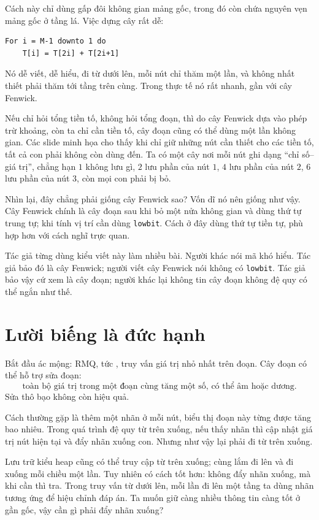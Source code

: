 \documentclass[11pt]{article}
\begin{document}
Cách này chỉ dùng gấp đôi không gian mảng gốc, trong đó còn chứa nguyên vẹn
mảng gốc ở tầng lá.  Việc dựng cây rất dễ:
\begin{verbatim}
For i = M-1 downto 1 do
    T[i] = T[2i] + T[2i+1]
\end{verbatim}
Nó dễ viết, dễ hiểu, đi từ dưới lên, mỗi nút chỉ thăm một lần, và không nhất
thiết phải thăm tới tầng trên cùng.  Trong thực tế nó rất nhanh, gần với cây
Fenwick.

Nếu chỉ hỏi tổng tiền tố, không hỏi tổng đoạn, thì do cây Fenwick dựa vào phép
trừ khoảng, còn ta chỉ cần tiền tố, cây đoạn cũng có thể dùng một lần không
gian.  Các slide minh họa cho thấy khi chỉ giữ những nút cần thiết cho các
tiền tố, tất cả con phải không còn dùng đến.  Ta có một cây nơi mỗi nút ghi
dạng ``chỉ số--giá trị'', chẳng hạn $1$ không lưu gì, $2$ lưu phần của nút
$1$, $4$ lưu phần của nút $2$, $6$ lưu phần của nút $3$, còn mọi con phải bị
bỏ.

Nhìn lại, đây chẳng phải giống cây Fenwick sao?  Vốn dĩ nó nên giống như vậy.
Cây Fenwick chính là cây đoạn sau khi bỏ một nửa không gian và dùng thứ tự
trung tự; khi tính vị trí cần dùng \texttt{lowbit}.  Cách ở đây dùng thứ tự
tiền tự, phù hợp hơn với cách nghĩ trực quan.

Tác giả từng dùng kiểu viết này làm nhiều bài.  Người khác nói mã khó hiểu.
Tác giả bảo đó là cây Fenwick; người viết cây Fenwick nói không có
\texttt{lowbit}.  Tác giả bảo vậy cứ xem là cây đoạn; người khác lại không tin
cây đoạn không đệ quy có thể ngắn như thế.

\section{Lười biếng là đức hạnh}

Bắt đầu ác mộng: RMQ, tức , truy vấn giá trị nhỏ nhất
trên đoạn.  Cây đoạn có thể hỗ trợ sửa đoạn:
\[
  \text{toàn bộ giá trị trong một đoạn cùng tăng một số, có thể âm hoặc dương.}
\]
Sửa thô bạo không còn hiệu quả.

Cách thường gặp là thêm một nhãn ở mỗi nút, biểu thị đoạn này từng được tăng
bao nhiêu.  Trong quá trình đệ quy từ trên xuống, nếu thấy nhãn thì cập nhật
giá trị nút hiện tại và đẩy nhãn xuống con.  Nhưng như vậy lại phải đi từ trên
xuống.

Lưu trữ kiểu heap cũng có thể truy cập từ trên xuống; cùng lắm đi lên và đi
xuống mỗi chiều một lần.  Tuy nhiên có cách tốt hơn: không đẩy nhãn xuống, mà
khi cần thì tra.  Trong truy vấn từ dưới lên, mỗi lần đi lên một tầng ta dùng
nhãn tương ứng để hiệu chỉnh đáp án.  Ta muốn giữ càng nhiều thông tin càng tốt
ở gần gốc, vậy cần gì phải đẩy nhãn xuống?
\end{document}
